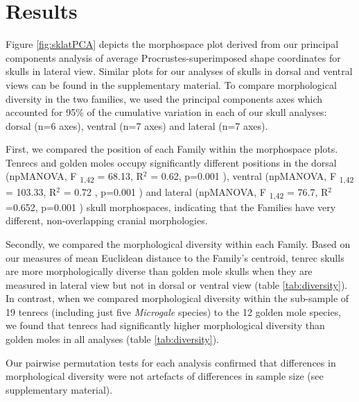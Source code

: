 \documentclass[12pt,a4paper]{article}
\begin{document}
\section{Results}
 
	Figure \ref{fig:sklatPCA} depicts the morphospace plot 
	derived from our principal components analysis of average Procrustes-superimposed shape coordinates for skulls in lateral view. Similar plots for our analyses of skulls in dorsal and ventral views can be found in the supplementary material.
	To compare morphological diversity in the two families, we used the principal components axes which accounted for 95\% of the cumulative variation in each of our skull analyses: dorsal (n=6 axes), ventral (n=7 axes) and lateral (n=7 axes). 
	
	First, we compared the position of each Family within the morphospace plots. Tenrecs and golden moles occupy significantly different positions in the dorsal 	(npMANOVA, F \textsubscript{1,42} = 68.13, R$^2$ = 0.62, p=0.001 ), ventral (npMANOVA, F \textsubscript{1,42} = 103.33, R$^2$ = 0.72 , p=0.001 ) and lateral (npMANOVA, F \textsubscript{1,42} = 76.7, R$^2$=0.652, p=0.001 ) skull morphospaces,  indicating that the Families have very different, non-overlapping cranial morphologies. 
	

	Secondly, we compared the morphological diversity within each Family. Based on our measures of mean Euclidean distance to the Family's centroid, tenrec skulls are more morphologically diverse than golden mole skulls when they are measured in lateral view but not in dorsal or ventral view (table \ref{tab:diversity}). In contrast, when we compared morphological diversity within the sub-sample of 19 tenrecs (including just five \textit{Microgale} species) to the 12 golden mole species, we found that tenrecs had significantly higher morphological diversity than golden moles in all analyses (table \ref{tab:diversity}).

	Our pairwise permutation tests for each analysis confirmed that differences in morphological diversity were not artefacts of differences in sample size (see supplementary material).
\end{document}
